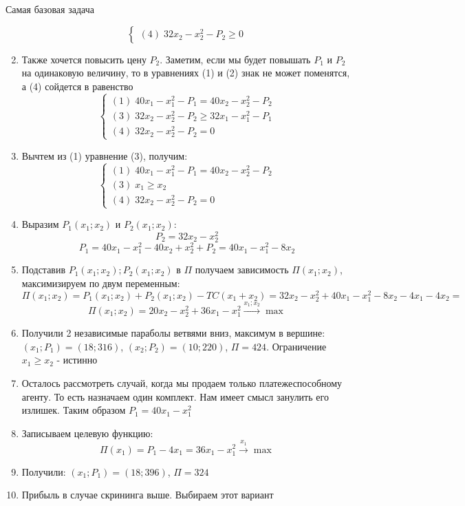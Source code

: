 \begin{mybox}{Самая базовая задача}
\begin{enumerate}
\begin{equation*}
\begin{cases}
           (4)\;32x_2-x_2^2-P_2\geq 0
         \end{cases}
        \end{equation*}
        \item Также хочется повысить цену $P_2$. Заметим, если мы будет повышать $P_1$ и $P_2$ на одинаковую величину, то в уравнениях (1) и (2) знак не может поменятся, а (4) сойдется в равенство
        \begin{equation*}
         \begin{cases}
           (1)\;40x_1-x_1^2-P_1= 40x_2-x_2^2-P_2
           \\
           (3)\;32x_2-x_2^2-P_2\geq 32x_1-x_1^2-P_1
           \\
           (4)\;32x_2-x_2^2-P_2= 0
         \end{cases}
        \end{equation*}
        \item Вычтем из (1) уравнение (3), получим:
        \begin{equation*}
         \begin{cases}
           (1)\;40x_1-x_1^2-P_1= 40x_2-x_2^2-P_2
           \\
           (3)\;x_1\geq x_2
           \\
           (4)\;32x_2-x_2^2-P_2= 0
         \end{cases}
        \end{equation*}
        \item Выразим $P_1(x_1;x_2)$ и $P_2(x_1;x_2)$:
        $$P_2=32x_2-x_2^2$$
        $$P_1=40x_1-x_1^2-40x_2+x_2^2+P_2=40x_1-x_1^2-8x_2$$
        \item Подставив $P_1(x_1;x_2);P_2(x_1;x_2)$ в $\Pi$ получаем зависимость $\Pi(x_1;x_2)$, максимизируем по двум переменным:
        $$\Pi(x_1;x_2)=P_1(x_1;x_2)+P_2(x_1;x_2)-TC(x_1+x_2)=32x_2-x_2^2+40x_1-x_1^2-8x_2-4x_1-4x_2=$$
        $$\Pi(x_1;x_2)=20x_2-x_2^2+36x_1-x_1^2\xrightarrow{x_1;x_2} \max$$
        \item Получили 2 независимые параболы ветвями вниз, максимум в вершине: $(x_1;P_1)=(18;316)$, $(x_2;P_2)=(10;220)$, $\Pi=424$. Ограничение $x_1\geq x_2$ - истинно
        \item Осталось рассмотреть случай, когда мы продаем только платежеспособному агенту. То есть назначаем один комплект. Нам имеет смысл занулить его излишек. Таким образом $P_1=40x_1-x_1^2$
        \item Записываем целевую функцию: $$\Pi(x_1)=P_1-4x_1=36x_1-x_1^2 \xrightarrow{x_1} \max$$
        \item Получили: $(x_1;P_1)=(18;396)$, $\Pi=324$
        \item Прибыль в случае скрининга выше. Выбираем этот вариант
    \end{enumerate}
\end{mybox}

